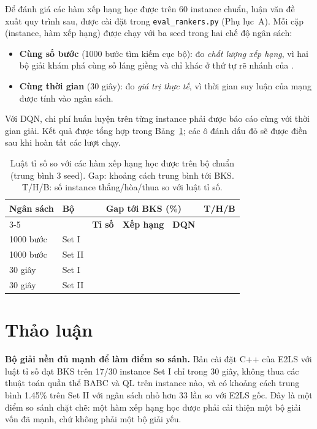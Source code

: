 Để đánh giá các hàm xếp hạng học được trên 60 instance chuẩn, luận văn đề xuất quy trình sau, được cài đặt trong \texttt{eval\_rankers.py} (Phụ lục~A). Mỗi cặp (instance, hàm xếp hạng) được chạy với ba seed trong hai chế độ ngân sách:
\begin{itemize}
  \item \textbf{Cùng số bước} (1000 bước tìm kiếm cục bộ): đo \emph{chất lượng xếp hạng}, vì hai bộ giải khám phá cùng số láng giềng và chỉ khác ở thứ tự rẽ nhánh của \addstar.
  \item \textbf{Cùng thời gian} (30 giây): đo \emph{giá trị thực tế}, vì thời gian suy luận của mạng được tính vào ngân sách.
\end{itemize}
Với DQN, chi phí huấn luyện trên từng instance phải được báo cáo cùng với thời gian giải. Kết quả được tổng hợp trong Bảng~\ref{tab:ranker_bench}; các ô đánh dấu đỏ sẽ được điền sau khi hoàn tất các lượt chạy.

\begin{table}[H]
\centering
\caption[Luật tỉ số so với các hàm xếp hạng học được trên bộ chuẩn]{Luật tỉ số so với các hàm xếp hạng học được trên bộ chuẩn (trung bình 3 seed). Gap: khoảng cách trung bình tới BKS. T/H/B: số instance thắng/hòa/thua so với luật tỉ số.}
\label{tab:ranker_bench}
\small
\begin{tabular}{llrrrr}
\toprule
\textbf{Ngân sách} & \textbf{Bộ} & \multicolumn{3}{c}{\textbf{Gap tới BKS (\%)}} & \textbf{T/H/B}\\
\cmidrule(lr){3-5}
 & & \textbf{Tỉ số} & \textbf{Xếp hạng} & \textbf{DQN} & \\
\midrule
1000 bước & Set I & \todo{...} & \todo{...} & \todo{...} & \todo{...}\\
1000 bước & Set II & \todo{...} & \todo{...} & \todo{...} & \todo{...}\\
30 giây & Set I & \todo{...} & \todo{...} & \todo{...} & \todo{...}\\
30 giây & Set II & \todo{...} & \todo{...} & \todo{...} & \todo{...}\\
\bottomrule
\end{tabular}
\end{table}

\section{Thảo luận}\label{sec:discussion}

\textbf{Bộ giải nền đủ mạnh để làm điểm so sánh.} Bản cài đặt C++ của E2LS với luật tỉ số đạt BKS trên 17/30 instance Set I chỉ trong 30 giây, không thua các thuật toán quần thể BABC và QL trên instance nào, và có khoảng cách trung bình 1.45\% trên Set II với ngân sách nhỏ hơn 33 lần so với E2LS gốc. Đây là một điểm so sánh chặt chẽ: một hàm xếp hạng học được phải cải thiện một bộ giải vốn đã mạnh, chứ không phải một bộ giải yếu.

